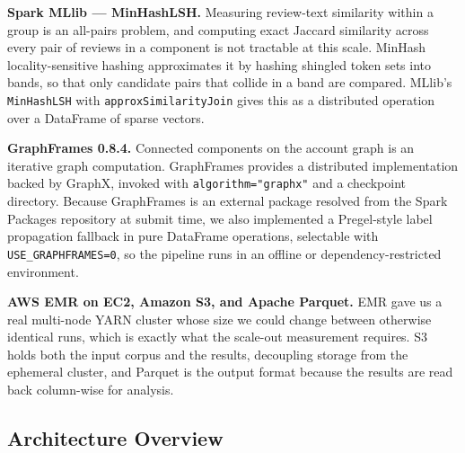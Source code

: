 \documentclass[12pt]{article}
\begin{document}
\textbf{Spark MLlib --- MinHashLSH.} Measuring review-text similarity within a
group is an all-pairs problem, and computing exact Jaccard similarity across
every pair of reviews in a component is not tractable at this scale. MinHash
locality-sensitive hashing approximates it by hashing shingled token sets into
bands, so that only candidate pairs that collide in a band are compared.
MLlib's \texttt{MinHashLSH} with \texttt{approxSimilarityJoin} gives this as a
distributed operation over a DataFrame of sparse vectors.

\textbf{GraphFrames 0.8.4.} Connected components on the account graph is an
iterative graph computation. GraphFrames provides a distributed implementation
backed by GraphX, invoked with \texttt{algorithm="graphx"} and a checkpoint
directory. Because GraphFrames is an external package resolved from the Spark
Packages repository at submit time, we also implemented a Pregel-style label
propagation fallback in pure DataFrame operations, selectable with
\texttt{USE\_GRAPHFRAMES=0}, so the pipeline runs in an offline or
dependency-restricted environment.

\textbf{AWS EMR on EC2, Amazon S3, and Apache Parquet.} EMR gave us a real
multi-node YARN cluster whose size we could change between otherwise identical
runs, which is exactly what the scale-out measurement requires. S3 holds both
the input corpus and the results, decoupling storage from the ephemeral
cluster, and Parquet is the output format because the results are read back
column-wise for analysis.

\subsection{Architecture Overview}

\begin{center}
\end{center}
\end{document}
